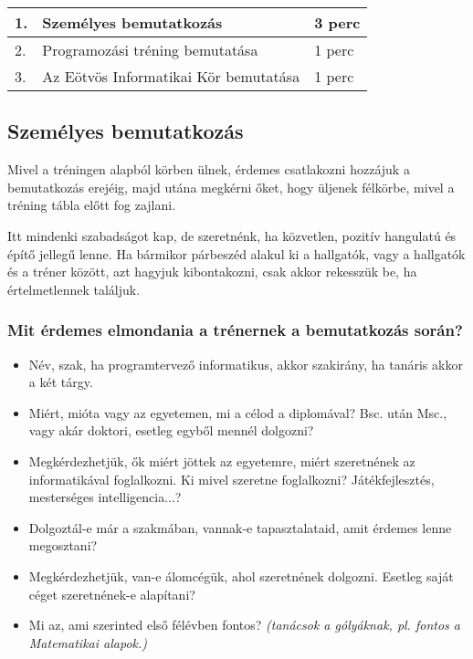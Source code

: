 \documentclass[../Main.tex]{subfiles}
\begin{document}
\begin{center}
    \begin{tabular}{| m{1.3 em} | m{} | m{} |}
    \hline
    1. & Személyes bemutatkozás & 3 perc \\
    \hline
    2. & Programozási tréning bemutatása & 1 perc \\
    \hline
    3. & Az Eötvös Informatikai Kör bemutatása & 1 perc \\
    \hline
    \end{tabular}
\end{center}

\subsection{Személyes bemutatkozás}
Mivel a tréningen alapból körben ülnek, érdemes csatlakozni hozzájuk a bemutatkozás erejéig,
majd utána megkérni őket, hogy üljenek félkörbe, mivel a tréning tábla előtt fog zajlani.

Itt mindenki szabadságot kap, de szeretnénk, ha közvetlen, pozitív hangulatú és építő jellegű
lenne. Ha bármikor párbeszéd alakul ki a hallgatók, vagy a hallgatók és a tréner között,
azt hagyjuk kibontakozni, csak akkor rekesszük be, ha értelmetlennek találjuk.

\subsubsection{Mit érdemes elmondania a trénernek a bemutatkozás során?}

\begin{itemize}
    \item Név, szak, ha programtervező informatikus, akkor szakirány,
    ha tanáris akkor a két tárgy.
    \item Miért, mióta vagy az egyetemen, mi a célod a diplomával?
    Bsc. után Msc., vagy akár doktori, esetleg egyből mennél dolgozni?
    \item Megkérdezhetjük, ők miért jöttek az egyetemre, miért szeretnének
    az informatikával foglalkozni. Ki mivel szeretne foglalkozni?
    Játékfejlesztés, mesterséges intelligencia...?
    \item Dolgoztál-e már a szakmában, vannak-e tapasztalataid, amit érdemes lenne megosztani?
    \item Megkérdezhetjük, van-e álomcégük, ahol szeretnének dolgozni.
    Esetleg saját céget szeretnének-e alapítani?
    \item Mi az, ami szerinted első félévben fontos? 
    \textit{(tanácsok a gólyáknak, pl. fontos a Matematikai alapok.)}
\end{itemize}
\end{document}
